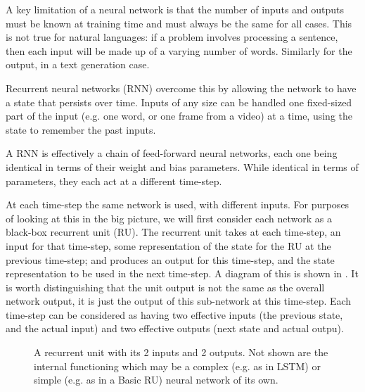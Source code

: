 \documentclass[12pt,parskip]{komatufte}
\begin{document}

A key limitation of a neural network is that the number of inputs and outputs must be known at training time and must always be the same for all cases.
This is not true for natural languages: if a problem involves processing a sentence, then each input will be made up of a varying number of words. Similarly for the output, in a text generation case.


Recurrent neural networks (RNN) overcome this by allowing the network to have a state that persists over time.
Inputs of any size can be handled one fixed-sized part of the input (e.g. one word, or one frame from a video) at a time, using the state to remember the past inputs.


A RNN is effectively a chain of feed-forward neural networks,
each one being identical in terms of their weight and bias parameters.
While identical in terms of parameters, they each act at a different time-step.



At each time-step the same network is used, with different inputs.
For purposes of looking at this in the big picture, we will first consider each network as a black-box recurrent unit (RU).
The recurrent unit takes at each time-step, an input for that time-step, some representation  of the state for the RU at the previous time-step; and produces an output for this time-step, and the state representation to be used in the next time-step.
A diagram of this is shown in .
It is worth distinguishing that the unit output is not the same as the overall network output, it is just the output of this sub-network at this time-step.
Each time-step can be considered as having two effective inputs (the previous state, and the actual input) and two effective outputs (next state and actual outpu).

\begin{figure}
	\caption{A recurrent unit with its 2 inputs and 2 outputs. Not shown are the internal functioning which may be a complex (e.g. as in LSTM) or simple (e.g. as in a Basic RU) neural network of its own.}
	\label{fig-ru}
	\centering
		
			
\end{figure}
\end{document}
